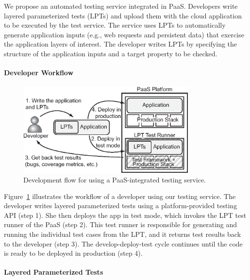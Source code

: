 We propose an automated testing service integrated in PaaS.  Developers write layered parameterized tests (LPTs) and upload them with the cloud application to be executed by the test service.  The service uses LPTs to automatically generate application inputs (e.g., web requests and persistent data) that exercise the application layers of interest.  The developer writes LPTs by specifying the structure of the application inputs and a target property to be checked.

\paragraph{Developer Workflow}

\begin{figure}
  \centering
  \includegraphics[width=0.8\textwidth]{paas/figures/developer-flow}
  \caption{Development flow for using a PaaS-integrated testing
    service.}
  \label{fig:development-flow}
\end{figure}

Figure~\ref{fig:development-flow} illustrates the workflow of a developer using our testing service.
%
The developer writes layered parameterized tests using a platform-provided testing API (step 1). She then deploys the app in test mode, which invokes the LPT test runner of the PaaS (step 2). This test runner is responsible for generating and running the individual test cases from the LPT, and it returns test results back to the developer (step 3). The develop-deploy-test cycle continues until the code is ready to be deployed in production (step 4).


\paragraph{Layered Parameterized Tests}

